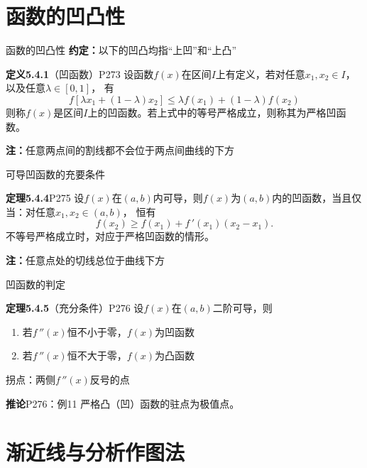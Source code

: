 \section{函数的凹凸性}

\begin{frame}{函数的凹凸性}
	\linespread{1.2}\pause
	{\bf 约定：}\alert{以下的凹凸均指“上凹”和“上凸”}\pause
	\begin{block}{{\bf 定义5.4.1}（凹函数）\hfill P273}
		设函数$f(x)$在区间$I$上有定义，若对任意$x_1,x_2\in I$，以及任意$\lambda\in[0,1]$，
		有
		$$f[\lambda x_1+(1-\lambda)x_2]\leq \lambda f(x_1)+(1-\lambda)f(x_2)$$
		则称$f(x)$是区间$I$上的{\bb 凹函数}。\pause 若上式中的等号严格成立，则称其为{\bb 严格凹函数}。
	\end{block}\pause
	{\bf 注：}\alert{任意两点间的割线都不会位于两点间曲线的下方}
\end{frame}

\begin{frame}{可导凹函数的充要条件}
	\linespread{1.2}\pause
	\begin{block}{{\bf 定理5.4.4}\hfill P275}
		设$f(x)$在$(a,b)$内可导，则$f(x)$为$(a,b)$内的凹函数，当且仅当：对任意$x_1,x_2\in(a,b)$，
		恒有
		$$f(x_2)\geq f(x_1)+f\,'(x_1)(x_2-x_1). $$
		\pause 不等号严格成立时，对应于严格凹函数的情形。
	\end{block}\pause
	{\bf 注：}\alert{任意点处的切线总位于曲线下方}
\end{frame}

\begin{frame}{凹函数的判定}
	\linespread{1.2}\pause
	\begin{block}{{\bf 定理5.4.5}（充分条件）\hfill P276}
		设$f(x)$在$(a,b)$二阶可导，则\pause
		\begin{enumerate}
		  \item 若$f\,''(x)$恒不小于零，$f(x)$为凹函数\pause
		  \item 若$f\,''(x)$恒不大于零，$f(x)$为凸函数
		\end{enumerate}
	\end{block}\pause
	{\bb 拐点：}两侧$f\,''(x)$反号的点\pause
	\begin{block}{{\bf 推论}\hfill P276：例11}
		严格凸（凹）函数的驻点为极值点。
	\end{block}
\end{frame}

\section{渐近线与分析作图法}

